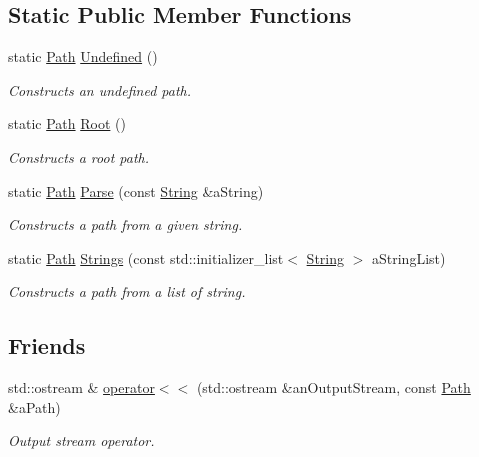 \subsection*{Static Public Member Functions}
\begin{DoxyCompactItemize}
\item 
static \hyperlink{classlibrary_1_1core_1_1fs_1_1_path}{Path} \hyperlink{classlibrary_1_1core_1_1fs_1_1_path_a0bb46bc56bc1bb180b114bae32477e06}{Undefined} ()
\begin{DoxyCompactList}\small\item\em Constructs an undefined path. \end{DoxyCompactList}\item 
static \hyperlink{classlibrary_1_1core_1_1fs_1_1_path}{Path} \hyperlink{classlibrary_1_1core_1_1fs_1_1_path_a59d9a7b2fcca844a82d22742b5a110ac}{Root} ()
\begin{DoxyCompactList}\small\item\em Constructs a root path. \end{DoxyCompactList}\item 
static \hyperlink{classlibrary_1_1core_1_1fs_1_1_path}{Path} \hyperlink{classlibrary_1_1core_1_1fs_1_1_path_a6ba644b6609507e724c217bf2020f5ae}{Parse} (const \hyperlink{classlibrary_1_1core_1_1types_1_1_string}{String} \&a\+String)
\begin{DoxyCompactList}\small\item\em Constructs a path from a given string. \end{DoxyCompactList}\item 
static \hyperlink{classlibrary_1_1core_1_1fs_1_1_path}{Path} \hyperlink{classlibrary_1_1core_1_1fs_1_1_path_a94a2bd454a137249bab970e29a5a95f2}{Strings} (const std\+::initializer\+\_\+list$<$ \hyperlink{classlibrary_1_1core_1_1types_1_1_string}{String} $>$ a\+String\+List)
\begin{DoxyCompactList}\small\item\em Constructs a path from a list of string. \end{DoxyCompactList}\end{DoxyCompactItemize}
\subsection*{Friends}
\begin{DoxyCompactItemize}
\item 
std\+::ostream \& \hyperlink{classlibrary_1_1core_1_1fs_1_1_path_a87813ac3ede0b43b50ae6b9fdf0a2815}{operator$<$$<$} (std\+::ostream \&an\+Output\+Stream, const \hyperlink{classlibrary_1_1core_1_1fs_1_1_path}{Path} \&a\+Path)
\begin{DoxyCompactList}\small\item\em Output stream operator. \end{DoxyCompactList}\end{DoxyCompactItemize}


